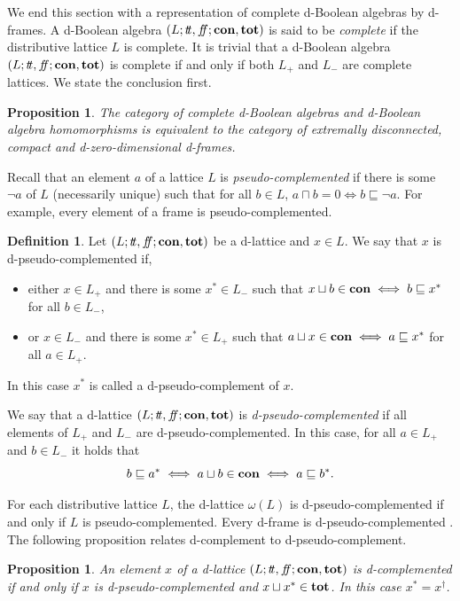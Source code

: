 \documentclass[11pt]{article}
\theoremstyle{plain}
\newtheorem{prop}[thm]{Proposition}
\theoremstyle{definition}
\newtheorem{defn}[thm]{Definition}
\newcommand{\dbt}{{t\!t}}
\newcommand{\dbf}{{f\!\!f}}
\begin{document}
We end this section with a representation of complete d-Boolean algebras by d-frames. A d-Boolean algebra $(L;\dbt,\dbf;{\bf con}, {\bf tot})$ is said to be \emph{complete} if the distributive lattice $L$ is complete. It is trivial that a d-Boolean algebra $(L;\dbt,\dbf;{\bf con}, {\bf tot})$ is complete if and only if both $L_+$ and $L_-$ are complete lattices.  We state the conclusion first.

\begin{prop} \label{complete dBA vs dfrm} The  category of complete d-Boolean algebras and d-Boolean algebra homomorphisms is equivalent to the category of extremally disconnected, compact and d-zero-dimensional d-frames.
\end{prop}


Recall that an element $a$ of a  lattice $L$ is \emph{pseudo-complemented} if there is some $\neg a$ of $L$ (necessarily unique) such that for all $b\in L$, $a\sqcap b=0\iff b\sqsubseteq \neg a$. For example, every element of a frame is pseudo-complemented.

\begin{defn}
Let $(L;\dbt,\dbf;{\bf con},{\bf tot})$ be a d-lattice and $x\in L$. We say that $x$ is  d-pseudo-complemented if, \begin{itemize} \setlength{\itemsep}{0pt} \item either $x\in L_+$ and there is  some  $x^*\in L_-$  such that   $x\sqcup b\in{\bf con}\iff b\sqsubseteq x^*$ for all $b\in L_-$, \item or $x\in L_-$ and there is some $x^*\in L_+$ such that  $a\sqcup x\in{\bf con}\iff a\sqsubseteq x^*$ for all $a\in L_+$. \end{itemize} In this case $x^*$ is called a  d-pseudo-complement of $x$. \end{defn}

We say that a d-lattice  $(L;\dbt,\dbf; {\bf con}, {\bf tot})$ is  \emph{d-pseudo-complemented} if all elements of $L_+$ and $L_-$ are d-pseudo-complemented. In this case, for all $a\in L_+$ and $b\in L_-$  it holds that $$b\sqsubseteq a^*\iff a\sqcup b\in{\bf con}\iff a\sqsubseteq b^*.$$ 


For each distributive lattice $L$, the d-lattice $\omega(L)$ is d-pseudo-complemented if and only if $L$ is pseudo-complemented. Every d-frame  is d-pseudo-complemented \cite{MMW}. 
The  following proposition relates d-complement to d-pseudo-complement.

\begin{prop}\label{d-complement as d-pseudo-complement} An element $x$ of a d-lattice $(L;\dbt,\dbf;{\bf con},{\bf tot})$   is d-complemented if and only if $x$  is d-pseudo-complemented and $x\sqcup x^*\in {\bf tot}$.   In this case  $x^*=x^\dag$.   
\end{prop}
\end{document}
